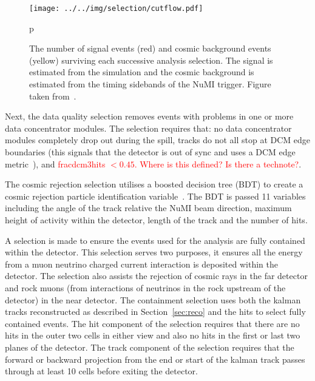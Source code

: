 \begin{figure}[h]
  \centering
  \texttt{[image: ../../img/selection/cutflow.pdf]}
  \caption{The number of signal events (red) and cosmic background
    events (yellow) surviving each successive analysis selection. The
    signal is estimated from the simulation and the cosmic background
    is estimated from the timing sidebands of the NuMI trigger. Figure
    taken from~\cite{NOvANumuSABless}.
  } 
  \label{fig:cosCutFlow}
p\end{figure}


Next, the data quality selection removes events with problems in one
or more data concentrator modules. 
The selection requires that: no data concentrator modules completely
drop out during the spill, tracks do not all stop at DCM edge
boundaries (this signals that the detector is out of sync and uses a
DCM edge metric~\cite{DCMEdgeMetric}), and
\textcolor{red}{fracdcm3hits $< 0.45$. Where is this defined? Is there
  a technote?}.

The cosmic rejection selection utilises a boosted decision tree (BDT)
to create a cosmic rejection particle identification
variable~\cite{CosRejTechnote}. 
The BDT is passed 11 variables including the angle of the track
relative the NuMI beam direction, maximum height of activity within
the detector, length of the track and the number of hits.

A selection is made to ensure the events used for the analysis are
fully contained within the detector. This selection serves two
purposes, it ensures all the energy from a muon neutrino charged
current interaction is deposited within the detector. The selection
also assists the rejection of cosmic rays in the far detector and rock
muons (from interactions of neutrinos in the rock upstream of the
detector) in the near detector.
The containment selection uses both the kalman tracks reconstructed as
described in Section~\ref{sec:reco} and the hits to select fully
contained events.
The hit component of the selection requires that there are no hits in
the outer two cells in either view and also no hits in the first or last
two planes of the detector.
The track component of the selection
requires that the forward or backward projection from the end or start
of the kalman track passes through at least 10 cells before exiting
the detector. 

